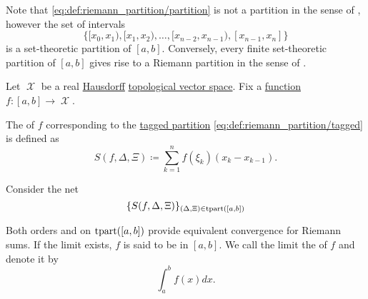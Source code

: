 \begin{remark}\label{rem:set_and_riemann_partitions}
  Note that \eqref{eq:def:riemann_partition/partition} is not a partition in the sense of , however the set of intervals
  \begin{equation*}
    \Big\{ [x_0, x_1), [x_1, x_2), \ldots, [x_{n-2}, x_{n-1}), [x_{n-1}, x_n] \Big\}
  \end{equation*}
  is a set-theoretic partition of \( [a, b] \). Conversely, every finite set-theoretic partition of \( [a, b] \) gives rise to a Riemann partition in the sense of .
\end{remark}

\begin{definition}\label{def:riemann_integral}
  Let \( \mscrX \) be a real \hyperref[def:separation_axioms/T2]{Hausdorff} \hyperref[def:topological_vector_space]{topological vector space}. Fix a \hyperref[def:function/single_valued]{function} \( f: [a, b] \to \mscrX \).

  The  of \( f \) corresponding to the \hyperref[def:riemann_partition/tagged]{tagged partition} \eqref{eq:def:riemann_partition/tagged} is defined as
  \begin{equation*}
    S(f, \Delta, \Xi) \coloneqq \sum_{k=1}^n f(\xi_k) (x_k - x_{k-1}).
  \end{equation*}

  Consider the net
  \begin{equation}\label{eq:def:riemann_integral/net}
    \{ S(f, \Delta, \Xi) \}_{(\Delta, \Xi) \in \operatorname{tpart}([a, b])}
  \end{equation}

  Both orders  and  on \( \operatorname{tpart}([a, b]) \) provide equivalent convergence for Riemann sums. If the limit exists, \( f \) is said to be  in \( [a, b] \). We call the limit the  of \( f \) and denote it by
  \begin{equation}\label{eq:def:riemann_integral}
    \int_a^b f(x) dx.
  \end{equation}
\end{definition}
